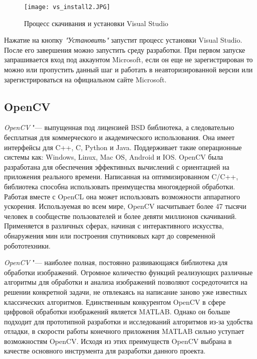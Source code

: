 \begin{figure}[h]
    \centering   
    \texttt{[image: vs\_install2.JPG]} 
    \caption{Процесс скачивания и установки Visual Studio}
    \label{fig:vs_install_progress}
\end{figure} 
Нажатие на кнопку \textit{"Установить"} запустит процесс установки Visual Studio. После его завершения можно запустить среду разработки. При первом запуске запрашивается вход под аккаунтом Microsoft, если он еще не зарегистрирован то можно или пропустить данный шаг и работать в неавторизированной версии или зарегистрироваться на официальном сайте Microsoft.

\subsection{OpenCV}
\label{sub:env_description:opencv}
\textit{OpenCV} "--- выпущенная под лицензией BSD библиотека, а следовательно бесплатная для коммерческого и академического использования. Она имеет интерфейсы для C++, C, Python и Java. Поддерживает такие операционные системы как: Windows, Linux, Mac OS, Android и IOS. OpenCV была разработана для обеспечения эффективных вычислений с ориентацией на приложения реального времени. Написанная на оптимизированном C/C++, библиотека способна использовать преимущества многоядерной обработки. Работая вместе с OpenCL она может использовать возможности аппаратного ускорения. Используемая во всем мире, OpenCV насчитывает более 47 тысячи человек в сообществе пользователей и более девяти миллионов скачиваний. Применяется в различных сферах, начиная с интерактивного искусства, обнаружения мин или построения спутниковых карт до современной робототехники. \cite{opencv_offical}

\textit{OpenCV} "--- наиболее полная, постоянно развивающаяся библиотека для обработки изображений. Огромное количество функций реализующих различные алгоритмы для обработки и анализа изображений позволяют сосредоточится на решении конкретной задачи, не отвлекаясь на написание заново уже известных классических алгоритмов. Единственным конкурентом OpenCV в сфере цифровой обработки изображений является MATLAB. Однако он больше подходит для прототипной разработки и исследований алгоритмов из-за удобства отладки, в скорости работы конечного приложения MATLAB сильно уступает возможностям OpenCV. Исходя из этих преимуществ OpenCV выбрана в качестве основного инструмента для разработки данного проекта. 

